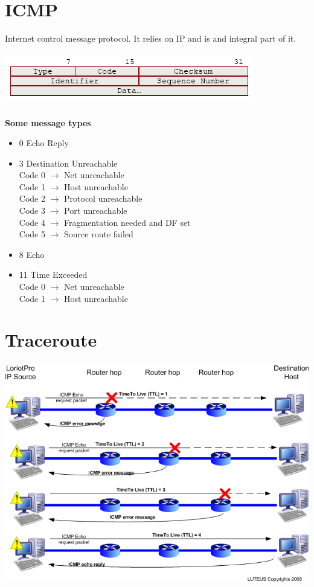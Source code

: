 \documentclass[10pt,a4paper]{book}
\begin{document}
\section{ICMP} Internet control message protocol. It relies on IP and is and integral part of it.\\\\
\includegraphics[scale=0.7]{img/icmp.png}\\\\
\textbf{Some message types}
\begin{itemize}
\item 0  Echo Reply
\item 3  Destination Unreachable\\
Code 0 $\to$ Net unreachable\\
Code 1 $\to$ Host unreachable\\
Code 2 $\to$ Protocol unreachable\\
Code 3 $\to$ Port unreachable\\
Code 4 $\to$ Fragmentation needed and DF set\\
Code 5 $\to$ Source route failed
\item 8  Echo
\item 11  Time Exceeded\\
Code 0 $\to$ Net unreachable\\
Code 1 $\to$ Host unreachable
\end{itemize}
\section{Traceroute}
\includegraphics[scale=0.5]{img/traceroute.png}
\newpage
\end{document}
